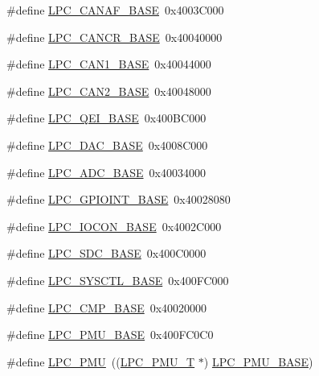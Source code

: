 \begin{DoxyCompactItemize}
\item 
\#define \hyperlink{group__PERIPH__407X__8X__BASE_gabc6943f9e943d63ecf4e236b4ce7c344}{L\-P\-C\-\_\-\-C\-A\-N\-A\-F\-\_\-\-B\-A\-S\-E}~0x4003\-C000
\item 
\#define \hyperlink{group__PERIPH__407X__8X__BASE_gac22b88e108d620661add143c174f8f11}{L\-P\-C\-\_\-\-C\-A\-N\-C\-R\-\_\-\-B\-A\-S\-E}~0x40040000
\item 
\#define \hyperlink{group__PERIPH__407X__8X__BASE_gaf2407c1927ebddd767832aefa74c3398}{L\-P\-C\-\_\-\-C\-A\-N1\-\_\-\-B\-A\-S\-E}~0x40044000
\item 
\#define \hyperlink{group__PERIPH__407X__8X__BASE_gab9608b3b72dd843a25910dd2a809106b}{L\-P\-C\-\_\-\-C\-A\-N2\-\_\-\-B\-A\-S\-E}~0x40048000
\item 
\#define \hyperlink{group__PERIPH__407X__8X__BASE_ga80fa25b18324c10c8e5c26893e6f0a67}{L\-P\-C\-\_\-\-Q\-E\-I\-\_\-\-B\-A\-S\-E}~0x400\-B\-C000
\item 
\#define \hyperlink{group__PERIPH__407X__8X__BASE_ga3bbaedad584252212d4704bb419489f6}{L\-P\-C\-\_\-\-D\-A\-C\-\_\-\-B\-A\-S\-E}~0x4008\-C000
\item 
\#define \hyperlink{group__PERIPH__407X__8X__BASE_ga2396e0d0c565e4c1c3b2fc593bd6c37f}{L\-P\-C\-\_\-\-A\-D\-C\-\_\-\-B\-A\-S\-E}~0x40034000
\item 
\#define \hyperlink{group__PERIPH__407X__8X__BASE_gadf88491f4b83b5af99eaf30778cb62fa}{L\-P\-C\-\_\-\-G\-P\-I\-O\-I\-N\-T\-\_\-\-B\-A\-S\-E}~0x40028080
\item 
\#define \hyperlink{group__PERIPH__407X__8X__BASE_gae48aea115d5924805263d7a15402d4fa}{L\-P\-C\-\_\-\-I\-O\-C\-O\-N\-\_\-\-B\-A\-S\-E}~0x4002\-C000
\item 
\#define \hyperlink{group__PERIPH__407X__8X__BASE_gab8f044e5911a6bf51879e4614bf2a0a3}{L\-P\-C\-\_\-\-S\-D\-C\-\_\-\-B\-A\-S\-E}~0x400\-C0000
\item 
\#define \hyperlink{group__PERIPH__407X__8X__BASE_gae4670b50fe27772fa31de1da10bec7b7}{L\-P\-C\-\_\-\-S\-Y\-S\-C\-T\-L\-\_\-\-B\-A\-S\-E}~0x400\-F\-C000
\item 
\#define \hyperlink{group__PERIPH__407X__8X__BASE_ga571228b687abe77c6e72bdbe00cf60a3}{L\-P\-C\-\_\-\-C\-M\-P\-\_\-\-B\-A\-S\-E}~0x40020000
\item 
\#define \hyperlink{group__PERIPH__407X__8X__BASE_ga865bed8ad61e9e273439ad1349a46d68}{L\-P\-C\-\_\-\-P\-M\-U\-\_\-\-B\-A\-S\-E}~0x400\-F\-C0\-C0
\item 
\#define \hyperlink{group__PERIPH__407X__8X__BASE_ga9d540cc313db00679c10f9ac1961b06a}{L\-P\-C\-\_\-\-P\-M\-U}~((\hyperlink{structLPC__PMU__T}{L\-P\-C\-\_\-\-P\-M\-U\-\_\-\-T}              $\ast$) \hyperlink{group__PERIPH__407X__8X__BASE_ga865bed8ad61e9e273439ad1349a46d68}{L\-P\-C\-\_\-\-P\-M\-U\-\_\-\-B\-A\-S\-E})

\end{DoxyCompactItemize}
